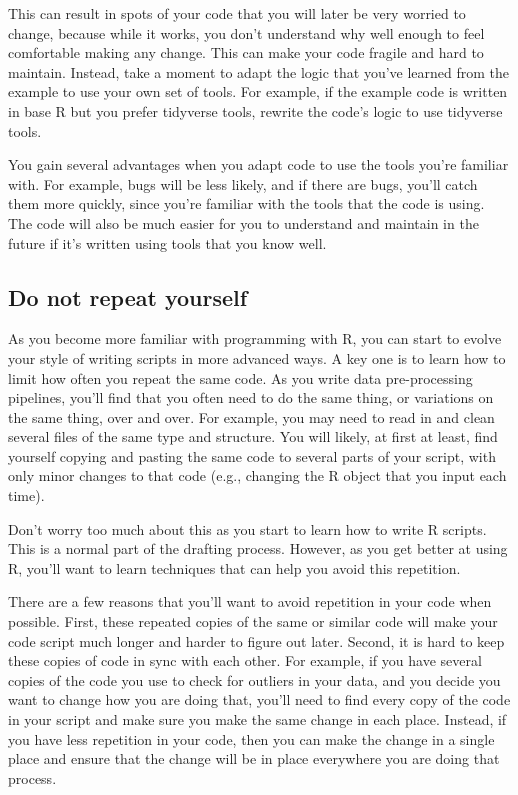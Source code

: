 \documentclass[]{tufte-book}
\begin{document}
This can result in spots of your code that you will later be very worried to
change, because while it works, you don't understand why well enough to feel
comfortable making any change. This can make your code fragile and hard to
maintain. Instead, take a moment to adapt the logic that you've learned from
the example to use your own set of tools. For example, if the example code is
written in base R but you prefer tidyverse tools, rewrite the code's logic
to use tidyverse tools.

You gain several advantages when you adapt code to use the tools you're familiar
with. For example, bugs will be less likely, and if there are bugs, you'll
catch them more quickly, since you're familiar with the tools that the code is
using. The code will also be much easier for you to understand and maintain in
the future if it's written using tools that you know well.

\subsection{Do not repeat yourself}\label{do-not-repeat-yourself}

As you become more familiar with programming with R, you can start to evolve your
style of writing scripts in more advanced ways. A key one is to learn how to limit
how often you repeat the same code. As you write data pre-processing pipelines, you'll
find that you often need to do the same thing, or variations on the same thing, over
and over. For example, you may need to read in and clean several files of the same
type and structure. You will likely, at first at least, find yourself copying and
pasting the same code to several parts of your script, with only minor changes to
that code (e.g., changing the R object that you input each time).

Don't worry too much about this as you start to learn how to write R scripts. This
is a normal part of the drafting process. However, as you get better at using R, you'll
want to learn techniques that can help you avoid this repetition.

There are a few reasons that you'll want to avoid repetition in your code when
possible. First, these repeated copies of the same or similar code will make your
code script much longer and harder to figure out later.
Second, it is hard to keep these copies of code in sync with each other. For example, if
you have several copies of the code you use to check for outliers in your data, and you
decide you want to change how you are doing that, you'll need to find every copy of
the code in your script and make sure you make the same change in each place. Instead,
if you have less repetition in your code, then you can make the change in a single place
and ensure that the change will be in place everywhere you are doing that process.
\end{document}
